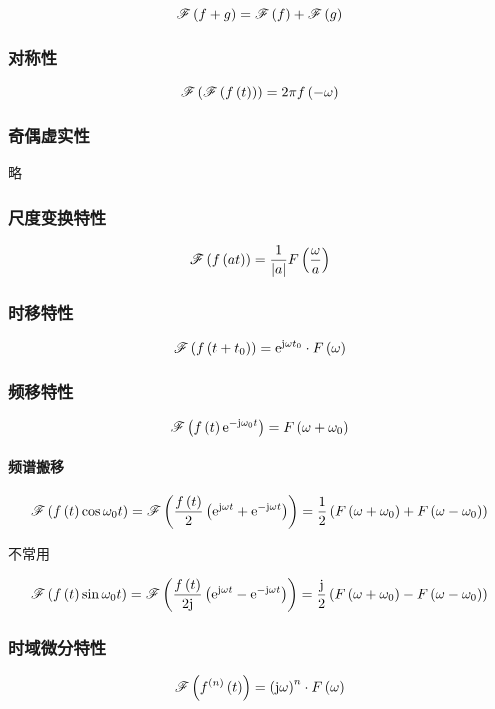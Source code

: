 \documentclass{article}
\begin{document}
\[\fourier{f+g}=\fourier f+\fourier g\]

\subsubsection{对称性}

\[\fourier{\fourier\ft}=2\pi f\pare{-\omega}\]

\subsubsection{奇偶虚实性}

略

\subsubsection{尺度变换特性}

\[\fourier{f\pare{at}}=\frac1{\abs a}F\pare{\frac\omega a}\]

\subsubsection{时移特性}

\[\fourier{f\pare{t+t_0}}=\e^{\j\omega t_0}\cdot F\pare{\omega}\]

\subsubsection{频移特性}

\[\fourier{\ft\e^{-\j\omega_0t}}=F\pare{\omega+\omega_0}\]

\paragraph{频谱搬移}

\[\fourier{\ft\cos\omega_0t}
    =\fourier{\frac\ft2\pare{\e^{\j\omega t}+\e^{-\j\omega t}}}
    =\frac12\pare{F\pare{\omega+\omega_0}+F\pare{\omega-\omega_0}}\]

不常用

\[\fourier{\ft\sin\omega_0t}
    =\fourier{\frac\ft{2\j}\pare{\e^{\j\omega t}-\e^{-\j\omega t}}}
    =\frac\j2\pare{F\pare{\omega+\omega_0}-F\pare{\omega-\omega_0}}\]

\subsubsection{时域微分特性}

\[\fourier{f^{\pare{n}}\pare{t}}=\pare{\j\omega}^n\cdot F\pare{\omega}\]
\end{document}
